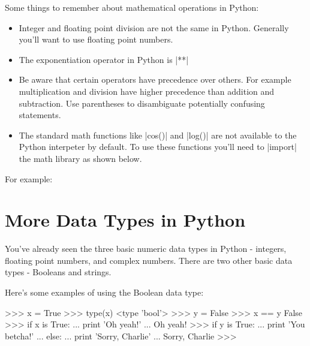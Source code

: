 Some things to remember about mathematical operations in Python:
\begin{itemize}
\item
  Integer and floating point division are not the same in Python.
  Generally you'll want to use floating point numbers.
\item
  The exponentiation operator in Python is |**|
\item
  Be aware that certain operators have precedence over others. For
  example multiplication and division have higher precedence than
  addition and subtraction. Use parentheses to disambiguate potentially
  confusing statements.
\item
  The standard math functions like |cos()| and
  |log()| are not available to the Python interpeter by
  default. To use these functions you'll need to |import| the
  math library as shown below.
\end{itemize}

For example:
%



\section{More Data Types in Python}

You've already seen the three basic numeric data types in Python -
integers, floating point numbers, and complex numbers. There are two
other basic data types - Booleans and strings.

Here's some examples of using the Boolean data type:
\begin{python}
>>> x = True
>>> type(x)
<type 'bool'>
>>> y = False
>>> x == y
False
>>> if x is True:
...     print 'Oh yeah!'
... 
Oh yeah!
>>> if y is True:
...     print 'You betcha!'
... else:
...     print 'Sorry, Charlie'
... 
Sorry, Charlie
>>>
\end{python}


